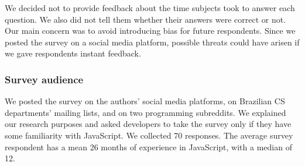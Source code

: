 We decided not to provide feedback about the time subjects took to answer each question. We also did not tell them whether their answers were correct or not. Our main concern was to avoid introducing bias for future respondents. Since we posted the survey on a social media platform, possible threats could have arisen if we gave respondents instant feedback.


\subsubsection*{Survey audience}

We posted the survey on the authors' social media platforms, on Brazilian CS departments' mailing lists, and on two programming subreddits. We explained our research purposes and asked developers to take the survey only if they have some familiarity with JavaScript. We collected 70 responses. The average survey respondent has a mean 26 months of experience in JavaScript, with a median of 12. 
